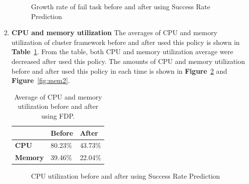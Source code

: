 \documentclass[12pt,oneside,openright,a4paper]{cpe-english-project}
\begin{document}
\begin{enumerate}
\begin{figure}[!h]
    \caption{Growth rate of fail task before and after using Success Rate Prediction}\label{fig:fail2}
\end{figure}

\newpage
  \item \textbf{CPU and memory utilization}
  \newline
  The averages of CPU and memory utilization of cluster framework before and after used this policy is shown in \textbf{Table}~\ref{tbl:po2CPUMem}. From the table, both CPU and memory utilization average were decreased after used this policy. The amounts of CPU and memory utilization before and after used this policy in each time is shown in \textbf{Figure}~\ref{fig:cpu2} and \textbf{Figure}~\ref{fig:mem2}. 
  \begin{table}[!h]
  \caption{Average of CPU and memory utilization before and after using FDP.}\label{tbl:po2CPUMem}
  \begin{tabular}{@{}|p{}|p{}|p{}|}
   \hline
   \textbf{} & \textbf{Before} & \textbf{After} \\ 
   \hline
   \textbf{CPU} & 80.23\% & 43.73\% \\ 
   \hline
   \textbf{Memory} & 39.46\% & 22.04\% \\ 
   \hline                     
  \end{tabular}
\end{table}
\begin{figure}[!h]\centering
    \setlength{\fboxrule}{0mm} %
    \setlength{\fboxsep}{0cm}
    \caption{CPU utilization before and after using Success Rate Prediction}\label{fig:cpu2}
\end{figure}
\begin{figure}[!h]\centering
    \setlength{\fboxrule}{0mm} %

\end{figure}
\end{enumerate}
\end{document}
